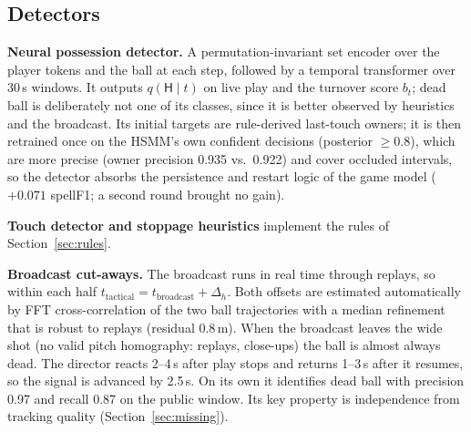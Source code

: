\documentclass[10pt,a4paper]{article}
\newcommand{\lH}{\mathsf{H}}
\begin{document}
\subsection{Detectors}
\textbf{Neural possession detector.} A permutation-invariant set encoder over the player tokens and
the ball at each step, followed by a temporal transformer over 30\,s windows. It outputs
$q(\lH\mid t)$ on live play and the turnover score $b_t$; dead ball is deliberately not one of its
classes, since it is better observed by heuristics and the broadcast. Its initial targets are
rule-derived last-touch owners; it is then retrained once on the HSMM's own confident decisions
(posterior $\ge0.8$), which are more precise (owner precision 0.935 vs.\ 0.922) and cover occluded
intervals, so the detector absorbs the persistence and restart logic of the game model
($+0.071$ spellF1; a second round brought no gain).

\textbf{Touch detector and stoppage heuristics} implement the rules of Section~\ref{sec:rules}.

\textbf{Broadcast cut-aways.} The broadcast runs in real time through replays, so within each half
$t_{\text{tactical}}=t_{\text{broadcast}}+\Delta_h$. Both offsets are estimated automatically by FFT
cross-correlation of the two ball trajectories with a median refinement that is robust to replays
(residual 0.8\,m). When the broadcast leaves the wide shot (no valid pitch homography: replays,
close-ups) the ball is almost always dead. The director reacts 2--4\,s after play stops and returns
1--3\,s after it resumes, so the signal is advanced by 2.5\,s. On its own it identifies dead ball
with precision 0.97 and recall 0.87 on the public window. Its key property is independence from
tracking quality (Section~\ref{sec:missing}).

\end{document}
